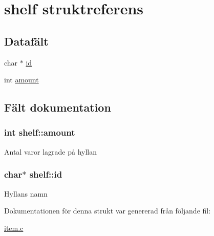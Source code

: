 \hypertarget{structshelf}{}\section{shelf struktreferens}
\label{structshelf}
\subsection*{Datafält}
\begin{DoxyCompactItemize}
\item 
char $\ast$ \hyperlink{structshelf_a7f8287189403254107701949e95c307a}{id}
\item 
int \hyperlink{structshelf_a6a1b09835f421eb1aa0d752411484733}{amount}
\end{DoxyCompactItemize}


\subsection{Fält dokumentation}
\subsubsection[{\texorpdfstring{amount}{amount}}]{\setlength{\rightskip}{0pt plus 5cm}int shelf\+::amount}\hypertarget{structshelf_a6a1b09835f421eb1aa0d752411484733}{}\label{structshelf_a6a1b09835f421eb1aa0d752411484733}
Antal varor lagrade på hyllan 
\subsubsection[{\texorpdfstring{id}{id}}]{\setlength{\rightskip}{0pt plus 5cm}char$\ast$ shelf\+::id}\hypertarget{structshelf_a7f8287189403254107701949e95c307a}{}\label{structshelf_a7f8287189403254107701949e95c307a}
Hyllans namn 

Dokumentationen för denna strukt var genererad från följande fil\+:\begin{DoxyCompactItemize}
\item 
\hyperlink{item_8c}{item.\+c}\end{DoxyCompactItemize}
